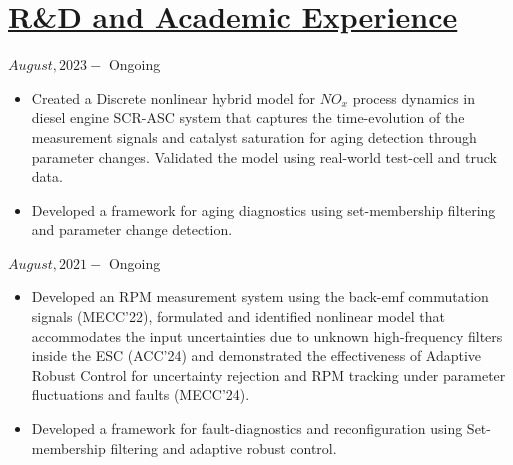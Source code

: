 \section*{\underline{R\&D and Academic Experience}}
\noindent {} \hfill $August, 2023 - $ Ongoing
\begin{itemize}
        \item Created a Discrete nonlinear hybrid model for $NO_x$ process dynamics in diesel engine SCR-ASC system that captures the time-evolution of the measurement signals and catalyst saturation for aging detection through parameter changes. Validated the model using real-world test-cell and truck data.
        \item Developed a framework for aging diagnostics using set-membership filtering and parameter change detection.
\end{itemize}

\medskip

\noindent {} \hfill $August, 2021 - $ Ongoing
\begin{itemize}
        \item Developed an RPM measurement system using the back-emf commutation signals (MECC'22), formulated and identified nonlinear model that accommodates the input uncertainties due to unknown high-frequency filters inside the ESC (ACC'24) and demonstrated the effectiveness of Adaptive Robust Control for uncertainty rejection and RPM tracking under parameter fluctuations and faults (MECC'24).
        \item Developed a framework for fault-diagnostics and reconfiguration using Set-membership filtering and adaptive robust control.
\end{itemize}

\medskip


